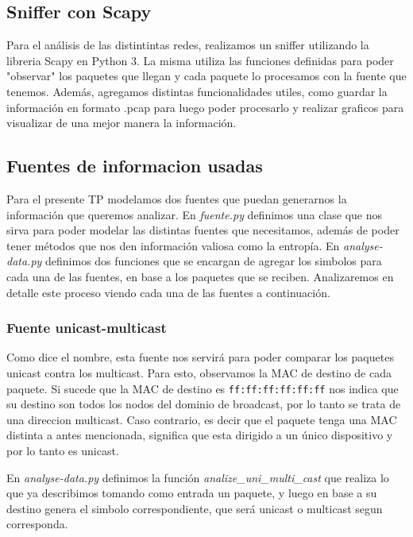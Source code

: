 \subsection{Sniffer con Scapy}

Para el an\'alisis de las distintintas redes, realizamos un sniffer utilizando la libreria Scapy en Python 3. La misma utiliza las funciones definidas para poder "observar" los paquetes que llegan y cada paquete lo procesamos con la fuente que tenemos. Adem\'as, agregamos distintas funcionalidades utiles, como guardar la informaci\'on en formato .pcap para luego poder procesarlo y realizar graficos para visualizar de una mejor manera la informaci\'on.

\subsection{Fuentes de informacion usadas}

Para el presente TP modelamos dos fuentes que puedan generarnos la informaci\'on que queremos analizar. En \textit{fuente.py} definimos una clase que nos sirva para poder modelar las distintas fuentes que necesitamos, adem\'as de poder tener m\'etodos que nos den informaci\'on valiosa como la entrop\'ia. En \textit{analyse-data.py} definimos dos funciones que se encargan de agregar los simbolos para cada una de las fuentes, en base a los paquetes que se reciben. Analizaremos en detalle este proceso viendo cada una de las fuentes a continuaci\'on.

\subsubsection{Fuente unicast-multicast}

Como dice el nombre, esta fuente nos servir\'a para poder comparar los paquetes unicast contra los multicast. Para esto, observamos la MAC de destino de cada paquete. Si sucede que la MAC de destino es \texttt{ff:ff:ff:ff:ff:ff} nos indica que su destino son todos los nodos del dominio de broadcast, por lo tanto se trata de una direccion multicast. Caso contrario, es decir que el paquete tenga una MAC distinta a antes mencionada, significa que esta dirigido a un \'unico dispositivo y por lo tanto es unicast.

En \textit{analyse-data.py} definimos la funci\'on \textit{analize\_uni\_multi\_cast} que realiza lo que ya describimos tomando como entrada un paquete, y luego en base a su destino genera el simbolo correspondiente, que será unicast o multicast segun corresponda.


